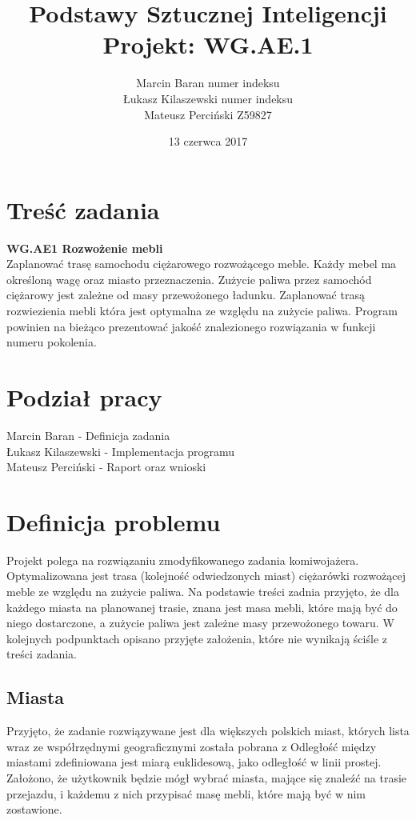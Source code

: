 \documentclass[11pt,a4paper]{article}
\title{Podstawy Sztucznej Inteligencji\\\large \medskip Projekt: WG.AE.1\\}
\author{Marcin Baran numer indeksu\\ Łukasz Kilaszewski numer indeksu\\ Mateusz Perciński Z59827}
\date{13 czerwca 2017}
\begin{document}
\maketitle
\tableofcontents

\section*{Treść zadania}
\textbf{WG.AE1 Rozwożenie mebli} \\
Zaplanować trasę samochodu ciężarowego rozwożącego meble. Każdy mebel ma określoną
wagę oraz miasto przeznaczenia. Zużycie paliwa przez samochód ciężarowy jest zależne od
masy przewożonego ładunku. Zaplanować trasą rozwiezienia mebli która jest optymalna ze
względu na zużycie paliwa. Program powinien na bieżąco prezentować jakość znalezionego
rozwiązania w funkcji numeru pokolenia.
\section*{Podział pracy}
Marcin Baran - Definicja zadania\\
Łukasz Kilaszewski - Implementacja programu\\
Mateusz Perciński - Raport oraz wnioski

\section{Definicja problemu}
Projekt polega na rozwiązaniu zmodyfikowanego zadania komiwojażera. Optymalizowana jest trasa (kolejność odwiedzonych miast) ciężarówki rozwożącej meble ze względu na zużycie paliwa. Na podstawie treści zadnia przyjęto, że dla każdego miasta na planowanej trasie, znana jest masa mebli, które mają być do niego dostarczone, a zużycie paliwa jest zależne masy przewożonego towaru. W kolejnych podpunktach opisano przyjęte założenia, które nie wynikają ściśle z treści zadania.

\subsection{Miasta}
Przyjęto, że zadanie rozwiązywane jest dla większych polskich miast, których lista wraz ze współrzędnymi geograficznymi została pobrana z %
Odległość między miastami zdefiniowana jest miarą euklidesową, jako odległość w linii prostej. Założono, że użytkownik będzie mógł wybrać miasta, mające się znaleźć na trasie przejazdu, i każdemu z nich przypisać masę mebli, które mają być w nim zostawione.
\end{document}
